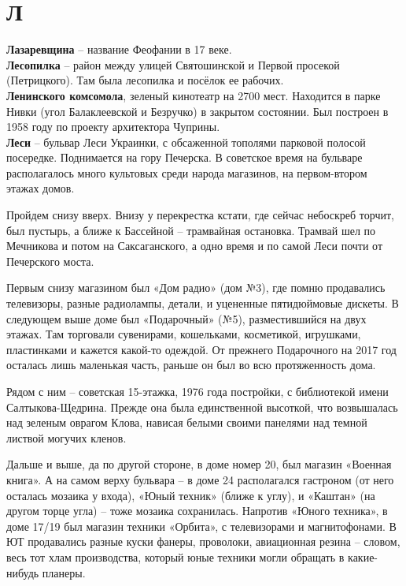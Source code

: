 \chapter*{Л}

\textbf{Лазаревщина} – название Феофании в 17 веке.\\

\textbf{Лесопилка} – район между улицей Святошинской и Первой просекой (Петрицкого). Там была лесопилка и посёлок ее рабочих.\\

\textbf{Ленинского комсомола}, зеленый кинотеатр на 2700 мест. Находится в парке Нивки (угол Балаклеевской и Безручко) в закрытом состоянии. Был построен в 1958 году по проекту архитектора Чуприны.\\

\textbf{Леси} – бульвар Леси Украинки, с обсаженной тополями парковой полосой посередке. По\-днимается на гору Печерска. В советское время на бульваре располагалось много культовых среди народа магазинов, на первом-втором этажах домов.

Пройдем снизу вверх. Внизу у перекрестка кстати, где сейчас небоскреб торчит, был пустырь, а ближе к Бассейной – трамвайная остановка. Трамвай шел по Мечникова и потом на Саксаганского, а одно время и по самой Леси почти от Печерского моста. 

Первым снизу магазином был «Дом радио» (дом №3), где помню продавались телевизоры, разные радиолампы, детали, и уцененные пятидюймовые дискеты. В следующем выше доме был  «Подарочный» (№5), разместившийся на двух этажах. Там торговали сувенирами, кошельками, косметикой, игрушками, пластинками и кажется какой-то одеждой. От прежнего Подарочного на 2017 год осталась лишь маленькая часть, раньше он был во всю протяженность дома. 

Рядом с ним – советская 15-этажка, 1976 года постройки, с библиотекой имени Салтыкова-Щедрина. Прежде она была единственной высоткой, что возвышалась над зеленым оврагом Клова, нависая белыми своими панелями над темной листвой могучих кленов.

Дальше и выше, да по другой стороне, в доме номер 20, был магазин «Военная книга». А на самом верху бульвара – в доме 24 располагался гастроном (от него осталась мозаика у входа), «Юный техник» (ближе к углу), и «Каштан» (на другом торце угла) – тоже мозаика сохранилась. Напротив «Юного техника», в доме 17/19 был магазин техники «Орбита», с телевизорами и магнитофонами. В ЮТ продавались разные куски фанеры, проволоки, авиационная резина – словом, весь тот хлам производства, который юные техники могли обращать в какие-нибудь планеры.\\

